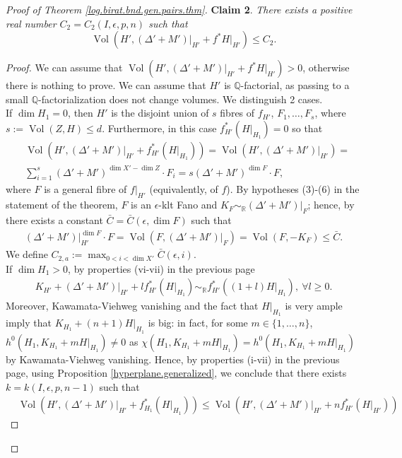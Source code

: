 \documentclass{amsart}[12pt,a4paper]
\theoremstyle{definition}
\DeclareMathOperator{\Vol}{\mathrm{Vol}}
\begin{document}
\begin{proof}[Proof of Theorem \ref{log.birat.bnd.gen.pairs.thm}]
{\bf Claim 2}. {\it There exists a positive real number $C_2=C_2(I, \epsilon, p, n)$ such that }
\[\Vol(H', (\Delta'+M')\vert_{H'} + f^\ast H\vert_{H'})  \leq C_2.\]
\begin{proof}
We can assume that $\Vol(H', (\Delta'+M')\vert_{H'} + f^\ast H\vert_{H'}) >0$, otherwise there is nothing to prove.
We can assume that $H'$ is $\mathbb{Q}$-factorial, as passing to a small $\mathbb{Q}$-factorialization does not change volumes.
We distinguish 2 cases.\\
If $\dim H_1=0$, then $H'$ is the disjoint union of $s$ fibres of $f_{H'}$, $F_1, \dots, F_s$, where $s:=\Vol(Z, H)\leq d$. 
Furthermore, in this case $f^\ast_{H'} (H|_{H_1}) = 0$ so that  
\begin{align*}
& \Vol(H', (\Delta'+M')\vert_{H'} + f^\ast_{H'} (H|_{H_1})) =\Vol(H', (\Delta'+M')\vert_{H'})=\\ 
& \sum_{i=1}^s(\Delta'+M')^{\dim X'-\dim Z}  \cdot F_i = s (\Delta'+M')^{\dim F}  \cdot F,
\end{align*}
where $F$ is a general fibre of $f\vert_{H'}$ (equivalently, of $f$).
By hypotheses (3)-(6) in the statement of the theorem, $F$ is an $\epsilon$-klt Fano and $K_{F} \sim_\mathbb{R} (\Delta'+M')\vert_{F}$; hence, by~\cite[Theorem 2.11]{bir16bab} there exists a constant $\bar{C}=\bar{C}(\epsilon, \dim F)$ such that 
\begin{align*}
(\Delta'+M')\vert_{H'}^{\dim F}  \cdot F = \Vol(F, (\Delta'+M')\vert_{F}) = \Vol(F, -K_F) \leq \bar{C}.
\end{align*}
We define $C_{2, a}:=\max_{0<i<\dim X'} \bar{C}(\epsilon, i)$.
\\
If $\dim H_1> 0$, by properties (vi-vii) in the previous page
\begin{align*}
K_{H'}+(\Delta'+M')\vert_{H'} + l f_{H'}^\ast (H\vert_{H_1}) \sim_\mathbb{R}  f_{H'}^\ast ((1+ l)H\vert_{H_1}), \ \forall l \geq 0.
\end{align*}
Moreover, Kawamata-Viehweg vanishing and the fact that $H\vert_{H_1}$ is very ample imply that $K_{H_1}+(n+1)H\vert_{H_1}$ is big: in fact, for some $m \in \{1, \dots, n\}$, $h^0(H_1, K_{H_1}+mH\vert_{H_1}) \neq 0$ as $\chi(H_1, K_{H_1}+mH\vert_{H_1})= h^0(H_1, K_{H_1}+mH\vert_{H_1})$ by Kawamata-Viehweg vanishing.
Hence, by properties (i-vii) in the previous page, using Proposition \ref{hyperplane.generalized}, we conclude that there exists $k=k(I, \epsilon, p, n-1)$ such that 
\begin{align*}
&\Vol(H', (\Delta'+M')\vert_{H'}+ f_{H_1}^\ast (H\vert_{H_1}) )
\leq \Vol(H', (\Delta'+M')\vert_{H'}+ n f_{H'}^\ast (H\vert_{H'}) )

\end{align*}
\end{proof}
\end{proof}
\end{document}
